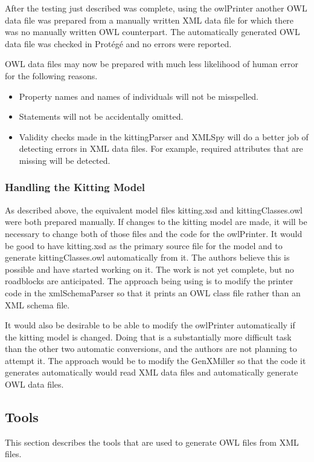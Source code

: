 After the testing just described was complete, using the owlPrinter
another OWL data file was prepared from a manually written XML data file
for which there was no manually written OWL counterpart. The automatically
generated OWL data file was checked in  Prot\'{e}g\'{e} and no errors were reported.

OWL data files
may now be prepared with much less likelihood of human error for the following
reasons.
\begin{itemize}

\item Property names and names of individuals will not be misspelled.

\item Statements will not be accidentally omitted.

\item Validity checks made in the kittingParser and XMLSpy will do a
  better job of detecting errors in XML data files. For example, required
  attributes that are missing will be detected.

\end{itemize}

\subsubsection{Handling the Kitting Model}
As described above, the equivalent model files kitting.xsd and
kittingClasses.owl were both prepared manually. If changes to the kitting
model are made, it will be necessary to change both of those files and the
code for the owlPrinter. It would be good to have kitting.xsd as the
primary source file for the model and to generate kittingClasses.owl
automatically from it. The authors believe this is possible and have
started working on it. The work is not yet complete, but no roadblocks are
anticipated. The approach being using is to modify the printer code in the
xmlSchemaParser so that it prints an OWL class file rather than an XML
schema file.

It would also be desirable to be able to modify the owlPrinter
automatically if the kitting model is changed. Doing that is a
substantially more difficult task than the other two automatic conversions,
and the authors are not planning to attempt it. The approach would be to
modify the GenXMiller so that the code it generates automatically would
read XML data files and automatically generate OWL data files.

\subsection{Tools}
This section describes the tools that are used to generate OWL files from XML files.
